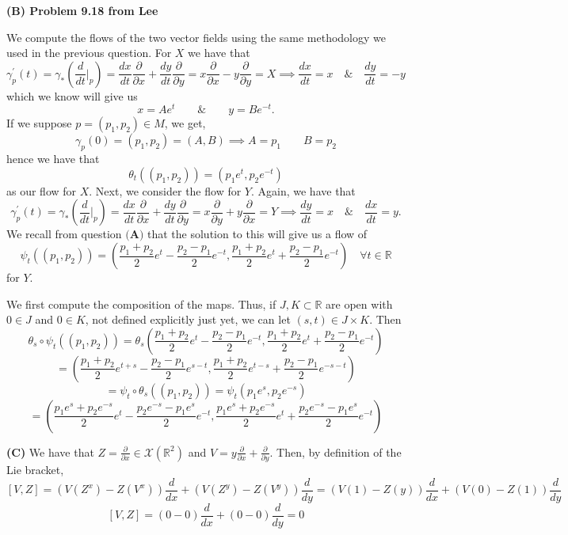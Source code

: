 \documentclass[10pt]{article}
\newcommand{\R}{\mathbb{R}}
\newcommand{\di}[2][]{\frac{\partial #1}{\partial #2}}
\newcommand{\del}[2][]{\frac{d #1}{d #2}}
\begin{document}
\textbf{(B) Problem 9.18 from Lee} 

We compute the flows of the two vector fields using the same methodology we used in the previous question. For $X$ we have that
\[ \gamma^{\prime}_{p}(t) = \gamma_{*}\left(\del{t}\bigg|_{p}\right) = \del[x]{t}\di{x} + \del[y]{t}\di{y} = x\di{x} - y\di{y} = X  \implies \del[x]{t} = x \hspace{1em} \& \hspace{1em} \del[y]{t} = -y\]
which we know will give us
\[ x = Ae^{t} \hspace{2em} \& \hspace{2em} y = Be^{-t}. \]
If we suppose $p = (p_{1},p_{2})\in M$, we get,
\[ \gamma_{p}(0) = (p_{1},p_{2}) = (A,B) \implies A = p_{1} \hspace{2em} B = p_{2}\]
hence we have that
\[ \theta_{t}((p_{1},p_{2})) = (p_{1}e^{t},p_{2}e^{-t}) \]
as our flow for $X$. Next, we consider the flow for $Y$. Again, we have that
\[ \gamma^{\prime}_{p}(t) = \gamma_{*}\left(\del{t}\bigg|_{p}\right) = \del[x]{t}\di{x} + \del[y]{t}\di{y} = x\di{y} + y\di{x} = Y  \implies \del[y]{t} = x \hspace{1em} \& \hspace{1em} \del[x]{t} = y.\]
We recall from question $\textbf{(A)}$ that the solution to this will give us a flow of 
\[ \psi_{t}((p_{1},p_{2})) = \left(\frac{p_{1}+p_{2}}{2}e^{t} - \frac{p_{2} - p_{1}}{2}e^{-t}, \frac{p_{1}+p_{2}}{2}e^{t} + \frac{p_{2} - p_{1}}{2}e^{-t}\right) \hspace{1em} \forall t\in \R\]
for $Y$.

We first compute the composition of the maps. Thus, if $J,K \subset \R$ are open with $0\in J$ and $0\in K$, not defined explicitly just yet,  we can let $(s,t) \in J\times K$. Then
\[ \theta_{s}\circ \psi_{t} ((p_{1},p_{2})) = \theta_{s}\left(\frac{p_{1}+p_{2}}{2}e^{t} - \frac{p_{2} - p_{1}}{2}e^{-t}, \frac{p_{1}+p_{2}}{2}e^{t} + \frac{p_{2} - p_{1}}{2}e^{-t}\right)\]
\[= \left(\frac{p_{1}+p_{2}}{2}e^{t+s} - \frac{p_{2} - p_{1}}{2}e^{s-t}, \frac{p_{1}+p_{2}}{2}e^{t-s} + \frac{p_{2} - p_{1}}{2}e^{-s-t}\right)\]
\[ = \psi_{t}\circ\theta_{s} ((p_{1},p_{2})) = \psi_{t}(p_{1}e^{s},p_{2}e^{-s})\]
\[ = \left(\frac{p_{1}e^{s}+p_{2}e^{-s}}{2}e^{t} - \frac{p_{2}e^{-s} - p_{1}e^{s}}{2}e^{-t}, \frac{p_{1}e^{s}+p_{2}e^{-s}}{2}e^{t} + \frac{p_{2}e^{-s} - p_{1}e^{s}}{2}e^{-t}\right) \]


\textbf{(C)} We have that $Z = \di{x} \in \mathcal{X}(\R^{2})$ and $V = y\di{x} + \di{y}$. Then, by definition of the Lie bracket,
\[ [V,Z] = (V(Z^{x}) - Z(V^{x}))\del{x} + (V(Z^{y}) - Z(V^{y}))\del{y} = (V(1) - Z(y))\del{x} + (V(0) - Z(1))\del{y}\]
\[ [V,Z] = (0 - 0)\del{x} + (0 - 0)\del{y} = 0 \]
\end{document}
